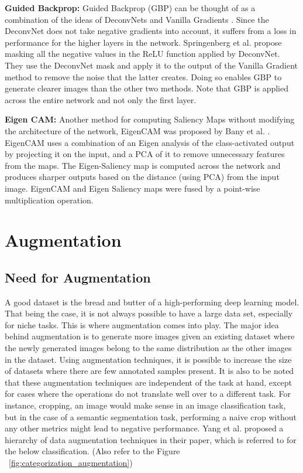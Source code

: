 \textbf{Guided Backprop: } Guided Backprop (GBP) \cite{springenbergStrivingSimplicityAll2015} can be thought of as a combination of the ideas of DeconvNets \cite{zeilerVisualizingUnderstandingConvolutional2013} and Vanilla Gradients \cite{simonyanDeepConvolutionalNetworks2014}. Since the DeconvNet does not take negative gradients into account, it suffers from a loss in performance for the higher layers in the network. Springenberg et al. propose masking all the negative values in the ReLU function applied by DeconvNet. They use the DeconvNet mask and apply it to the output of the Vanilla Gradient method to remove the noise that the latter creates. Doing so enables GBP to generate clearer images than the other two methods. Note that GBP is applied across the entire network and not only the first layer.

\textbf{Eigen CAM: } Another method for computing Saliency Maps without modifying the architecture of the network, EigenCAM was proposed by Bany et al. \cite{banymuhammadEigenCAMVisualExplanations2021}. EigenCAM uses a combination of an Eigen analysis of the class-activated output by projecting it on the input, and a PCA of it to remove unnecessary features from the maps. The Eigen-Saliency map is computed across the network and produces sharper outputs based on the distance (using PCA) from the input image. EigenCAM and Eigen Saliency maps were fused by a point-wise multiplication operation.

\section{Augmentation} \label{sec:augmentation}
\subsection{Need for Augmentation}

A good dataset is the bread and butter of a high-performing deep learning model. That being the case, it is not always possible to have a large data set, especially for niche tasks. This is where augmentation comes into play. The major idea behind augmentation is to generate more images given an existing dataset where the newly generated images belong to the same distribution as the other images in the dataset. Using augmentation techniques, it is possible to increase the size of datasets where there are few annotated samples present. It is also to be noted that these augmentation techniques are independent of the task at hand, except for cases where the operations do not translate well over to a different task. For instance, cropping, an image would make sense in an image classification task, but in the case of a semantic segmentation task, performing a naive crop without any other metrics might lead to negative performance. Yang et al. \cite{yangImageDataAugmentation2022} proposed a hierarchy of data augmentation techniques in their paper, which is referred to for the below classification. (Also refer to the Figure ~\ref{fig:categorization_augmentation})

